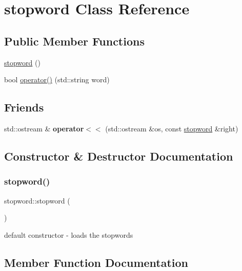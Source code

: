 \hypertarget{classstopword}{}\section{stopword Class Reference}
\label{classstopword}
\subsection*{Public Member Functions}
\begin{DoxyCompactItemize}
\item 
\hyperlink{classstopword_a27bd1c2cc2608cc3fef800a6e1c2edd6}{stopword} ()
\item 
bool \hyperlink{classstopword_aacff4cadb3e0722bd9029713397f982b}{operator()} (std\+::string word)
\end{DoxyCompactItemize}
\subsection*{Friends}
\begin{DoxyCompactItemize}
\item 
\mbox{\label{classstopword_a36822e395ed74489396c7bdd533ec54e}} 
std\+::ostream \& {\bfseries operator$<$$<$} (std\+::ostream \&os, const \hyperlink{classstopword}{stopword} \&right)
\end{DoxyCompactItemize}


\subsection{Constructor \& Destructor Documentation}
\mbox{\label{classstopword_a27bd1c2cc2608cc3fef800a6e1c2edd6}} 
\subsubsection{\texorpdfstring{stopword()}{stopword()}}
{\footnotesize\ttfamily stopword\+::stopword (\begin{DoxyParamCaption}{ }\end{DoxyParamCaption})}

default constructor -\/ loads the stopwords 

\subsection{Member Function Documentation}
\mbox{\label{classstopword_aacff4cadb3e0722bd9029713397f982b}} 
